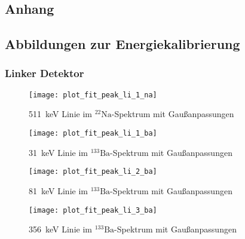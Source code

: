\documentclass[11pt, ngerman, fleqn, DIV=15, headinclude, BCOR=2cm]{scrreprt}
\begin{document}
\begin{appendix}
\chapter{Anhang}

\section{Abbildungen zur Energiekalibrierung} \label{anhang-energiekalibrierung}

\subsection{Linker Detektor}
\begin{figure}[h]
    \centering
    \texttt{[image: plot\_fit\_peak\_li\_1\_na]}
    \caption{%
	    \SI{511}{\kilo\electronvolt} Linie im $^{22}\text{Na}$-Spektrum mit
	    Gaußanpassungen
   }
    \label{fig:plot_fit_peak_li_1_Na}
\end{figure}
\begin{figure}[h]
    \centering
    \texttt{[image: plot\_fit\_peak\_li\_1\_ba]}
    \caption{%
	    \SI{31}{\kilo\electronvolt} Linie im $^{133}\text{Ba}$-Spektrum mit
	    Gaußanpassungen
   }
    \label{fig:plot_fit_peak_li_1_Ba}
\end{figure}
\begin{figure}[h]
    \centering
    \texttt{[image: plot\_fit\_peak\_li\_2\_ba]}
    \caption{%
	    \SI{81}{\kilo\electronvolt} Linie im $^{133}\text{Ba}$-Spektrum mit
	    Gaußanpassungen
   }
    \label{fig:plot_fit_peak_li_2_Ba}
\end{figure}
\begin{figure}[h]
    \centering
    \texttt{[image: plot\_fit\_peak\_li\_3\_ba]}
    \caption{%
	    \SI{356}{\kilo\electronvolt} Linie im $^{133}\text{Ba}$-Spektrum mit
	    Gaußanpassungen
   }
    \label{fig:plot_fit_peak_li_3_Ba}
\end{figure}
\clearpage


\end{appendix}
\end{document}
